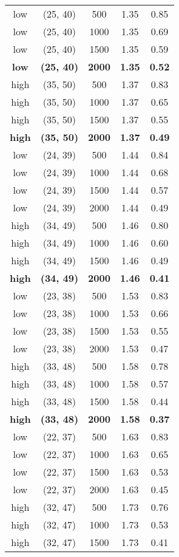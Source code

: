 \begin{tabular}{c c c c c}
low & (25, 40) &  500 & 1.35 & 0.85 \\
low & (25, 40) &  1000 & 1.35 & 0.69 \\
low & (25, 40) &  1500 & 1.35 & 0.59 \\
\textbf{low} & \textbf{(25, 40)} & \textbf{ 2000} & \textbf{1.35} & \textbf{0.52} \\
high & (35, 50) &  500 & 1.37 & 0.83 \\
high & (35, 50) &  1000 & 1.37 & 0.65 \\
high & (35, 50) &  1500 & 1.37 & 0.55 \\
\textbf{high} & \textbf{(35, 50)} & \textbf{ 2000} & \textbf{1.37} & \textbf{0.49} \\
low & (24, 39) &  500 & 1.44 & 0.84 \\
low & (24, 39) &  1000 & 1.44 & 0.68 \\
low & (24, 39) &  1500 & 1.44 & 0.57 \\
low & (24, 39) &  2000 & 1.44 & 0.49 \\
high & (34, 49) &  500 & 1.46 & 0.80 \\
high & (34, 49) &  1000 & 1.46 & 0.60 \\
high & (34, 49) &  1500 & 1.46 & 0.49 \\
\textbf{high} & \textbf{(34, 49)} & \textbf{ 2000} & \textbf{1.46} & \textbf{0.41} \\
low & (23, 38) &  500 & 1.53 & 0.83 \\
low & (23, 38) &  1000 & 1.53 & 0.66 \\
low & (23, 38) &  1500 & 1.53 & 0.55 \\
low & (23, 38) &  2000 & 1.53 & 0.47 \\
high & (33, 48) &  500 & 1.58 & 0.78 \\
high & (33, 48) &  1000 & 1.58 & 0.57 \\
high & (33, 48) &  1500 & 1.58 & 0.44 \\
\textbf{high} & \textbf{(33, 48)} & \textbf{ 2000} & \textbf{1.58} & \textbf{0.37} \\
low & (22, 37) &  500 & 1.63 & 0.83 \\
low & (22, 37) &  1000 & 1.63 & 0.65 \\
low & (22, 37) &  1500 & 1.63 & 0.53 \\
low & (22, 37) &  2000 & 1.63 & 0.45 \\
high & (32, 47) &  500 & 1.73 & 0.76 \\
high & (32, 47) &  1000 & 1.73 & 0.53 \\
high & (32, 47) &  1500 & 1.73 & 0.41 \\

\end{tabular}
